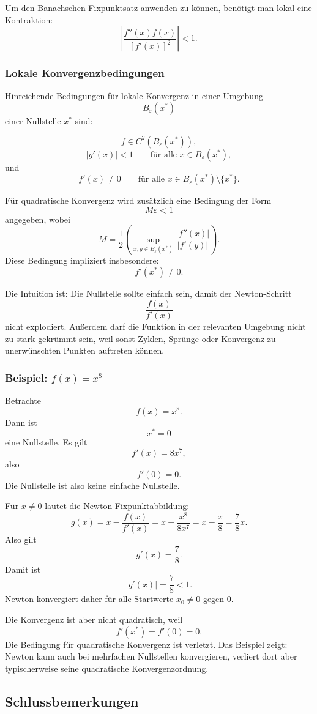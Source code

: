 \documentclass[10pt, letterpaper]{article}
\begin{document}
Um den Banachschen Fixpunktsatz anwenden zu können, benötigt man lokal eine Kontraktion:
\[
\boxed{
\left|
\frac{f''(x)f(x)}
{[f'(x)]^2}
\right|
<1.
}
\]

\subsubsection{Lokale Konvergenzbedingungen}

Hinreichende Bedingungen für lokale Konvergenz in einer Umgebung
\[
B_\varepsilon(x^\ast)
\]
einer Nullstelle \(x^\ast\) sind:

\[
f\in C^2(B_\varepsilon(x^\ast)),
\]
\[
|g'(x)|<1
\qquad
\text{für alle }
x\in B_\varepsilon(x^\ast),
\]
und
\[
f'(x)\neq 0
\qquad
\text{für alle }
x\in B_\varepsilon(x^\ast)\setminus\{x^\ast\}.
\]

Für quadratische Konvergenz wird zusätzlich eine Bedingung der Form
\[
M\varepsilon<1
\]
angegeben, wobei
\[
M=
\frac12
\left(
\sup_{x,y\in B_\varepsilon(x^\ast)}
\frac{|f''(x)|}{|f'(y)|}
\right).
\]
Diese Bedingung impliziert insbesondere:
\[
f'(x^\ast)\neq 0.
\]

Die Intuition ist: Die Nullstelle sollte einfach sein, damit der Newton-Schritt
\[
\frac{f(x)}{f'(x)}
\]
nicht explodiert. Außerdem darf die Funktion in der relevanten Umgebung nicht zu stark gekrümmt sein, weil sonst Zyklen, Sprünge oder Konvergenz zu unerwünschten Punkten auftreten können.

\subsubsection{Beispiel: \(f(x)=x^8\)}

Betrachte
\[
f(x)=x^8.
\]
Dann ist
\[
x^\ast=0
\]
eine Nullstelle. Es gilt
\[
f'(x)=8x^7,
\]
also
\[
f'(0)=0.
\]
Die Nullstelle ist also keine einfache Nullstelle.

Für \(x\neq 0\) lautet die Newton-Fixpunktabbildung:
\[
g(x)
=
x-\frac{f(x)}{f'(x)}
=
x-\frac{x^8}{8x^7}
=
x-\frac{x}{8}
=
\frac78x.
\]
Also gilt
\[
g'(x)=\frac78.
\]
Damit ist
\[
|g'(x)|=\frac78<1.
\]
Newton konvergiert daher für alle Startwerte \(x_0\neq 0\) gegen \(0\).

Die Konvergenz ist aber nicht quadratisch, weil
\[
f'(x^\ast)=f'(0)=0.
\]
Die Bedingung für quadratische Konvergenz ist verletzt. Das Beispiel zeigt: Newton kann auch bei mehrfachen Nullstellen konvergieren, verliert dort aber typischerweise seine quadratische Konvergenzordnung.

\subsection{Schlussbemerkungen}
\end{document}
